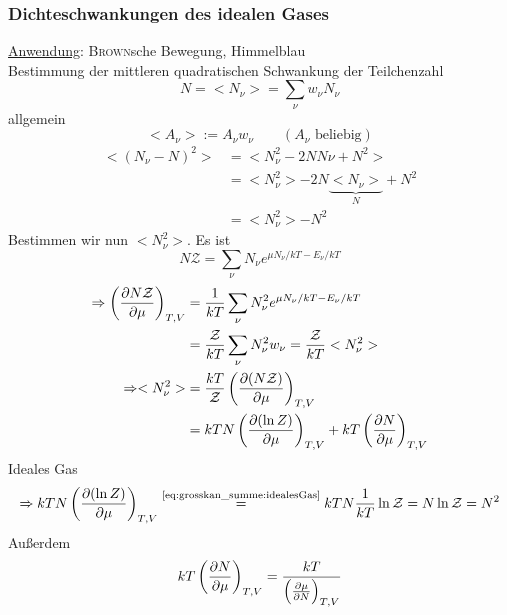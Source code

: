 \subsubsection{Dichteschwankungen des idealen Gases}
\underline{Anwendung}: \textsc{Brown}sche Bewegung, Himmelblau \\[\baselineskip]
Bestimmung der mittleren quadratischen Schwankung der Teilchenzahl \\
\begin{equation}
    N = <N_\nu> = \sum_\nu w_\nu N_\nu
\end{equation}
allgemein
\begin{equation}
    <A_\nu> := A_\nu w_\nu \qquad (A_\nu \text{ beliebig})
\end{equation}
\begin{equation}
    \begin{split}
    <(N_\nu - N)^2> &= <N_\nu^2 - 2 N N\nu + N^2> \\ 
    &= <N_\nu^2> - 2 N \underbrace{<N_\nu>}_{N} + N^2 \\
    &= <N_\nu^2> - N^2
    \end{split}
\end{equation}
Bestimmen wir nun $<N_\nu^2>$. Es ist
\begin{equation}
    N \mathcal{Z} = \sum_\nu N_\nu e^{\mu N_\nu / kT - E_\nu / kT}
\end{equation}
\begin{equation}
    \begin{split}
        \Rightarrow \left( \frac{\partial N \mathcal{Z}}{\partial \mu} \right)_{T, V}& = \frac{1}{k T} \sum_\nu N_\nu^2 e^{\mu N_\nu / k T - E_\nu / k T} \\
        &= \frac{\mathcal{Z}}{k T} \sum_\nu N_\nu^2 w_\nu = \frac{\mathcal{Z}}{k T} <N_\nu^2> \\
        \Rightarrow <N_\nu^2> &= \frac{k T}{\mathcal{Z}} \left( \frac{\partial (N \mathcal{Z})}{\partial \mu} \right)_{T, V} \\
        &= k T N \left( \frac{\partial (\ln Z)}{\partial \mu} \right)_{T, V} + kT \left( \frac{\partial N}{\partial \mu} \right)_{T, V}
    \end{split}
\end{equation}
Ideales Gas
\begin{equation}
    \Rightarrow k T N \left( \frac{\partial (\ln Z)}{\partial \mu} \right)_{T, V} \overset{\text{\ref{eq:grosskan_summe:idealesGas}}}{=} k T N \frac{1}{k T} \ln \mathcal{Z} = N \ln \mathcal{Z} = N^2
\end{equation}
Außerdem
\begin{equation}
    k T \left( \frac{\partial N}{\partial \mu} \right)_{T, V} = \frac{k T}{\left( \frac{\partial \mu}{\partial N} \right)_{T, V}}
\end{equation}
